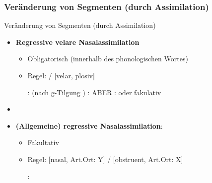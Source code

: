 %
\subsubsection{Veränderung von Segmenten (durch Assimilation)}
%

\begin{frame}{Veränderung von Segmenten (durch Assimilation)}

\begin{itemize}
	\item \textbf{Regressive velare Nasalassimilation}

	\begin{itemize}
		\item Obligatorisch (innerhalb des phonologischen Wortes)
		\item Regel:  \ras \textipa{[N]} /  \underline{\quad} [velar, plosiv]

	\eal		
		\ex {}:  \ras {} (nach g-Tilgung \ras \textipa{[fy:.{\textscr}UN]})
		\ex {}:  \ras \textipa{[baNk]}
		\ex ABER :  \ras {} oder fakulativ 
	\zl
	
	\end{itemize}
	
	\item[]
	\item \textbf{(Allgemeine) regressive Nasalassimilation}:

	\begin{itemize}
		\item Fakultativ
		\item Regel: [nasal, Art.Ort: Y]  /  \underline{\quad} [obstruent, Art.Ort: X]

		\ea {}:  \ras \textipa{[fYmf]}
		\z
		
	\end{itemize}		

\end{itemize}

\end{frame}



